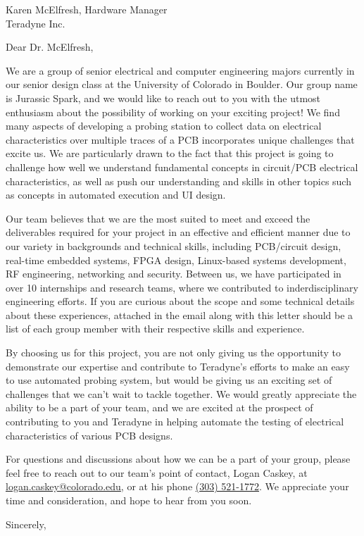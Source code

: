 \documentclass{letter}
\begin{document}
\begin{letter}
{Karen McElfresh, Hardware Manager\\
Teradyne Inc.
}

\opening{Dear Dr. McElfresh,}

We are a group of senior electrical and computer engineering majors currently in our senior design class at the University of Colorado in Boulder. Our group name is Jurassic Spark, and we would like to reach out to you with the utmost enthusiasm about the possibility of working on your exciting project! We find many aspects of developing a probing station to collect data on electrical characteristics over multiple traces of a PCB incorporates unique challenges that excite us. We are particularly drawn to the fact that this project is going to challenge how well we understand fundamental concepts in circuit/PCB electrical characteristics, as well as push our understanding and skills in other topics such as concepts in automated execution and UI design. 

Our team believes that we are the most suited to meet and exceed the deliverables required for your project in an effective and efficient manner due to our variety in backgrounds and technical skills, including PCB/circuit design, real-time embedded systems, FPGA design, Linux-based systems development, RF engineering, networking and security. Between us, we have participated in over 10 internships and research teams, where we contributed to inderdisciplinary engineering efforts. If you are curious about the scope and some technical details about these experiences, attached in the email along with this letter should be a list of each group member with their respective skills and experience. 

By choosing us for this project, you are not only giving us the opportunity to demonstrate our expertise and contribute to Teradyne's efforts to make an easy to use automated probing system, but would be giving us an exciting set of challenges that we can't wait to tackle together. We would greatly appreciate the ability to be a part of your team, and we are excited at the prospect of contributing to you and Teradyne in helping automate the testing of electrical characteristics of various PCB designs. 

For questions and discussions about how we can be a part of your group, please feel free to reach out to our team's point of contact, Logan Caskey, at \href{mailto:logan.caskey@colorado.edu}{logan.caskey@colorado.edu}, or at his phone \href{tel:+13035211772}{(303) 521-1772}. We appreciate your time and consideration, and hope to hear from you soon.

\vspace{1em}

\closing{Sincerely,}

\end{letter}
\end{document}
